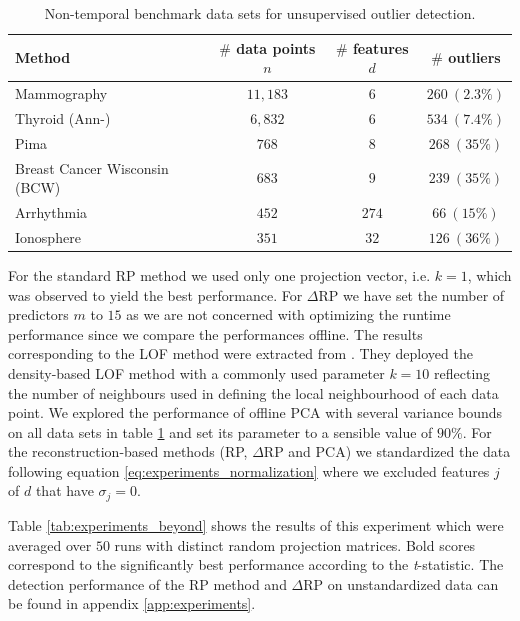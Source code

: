 \begin{table}[h]
	\centering
	\vspace{-0.05cm}
	\caption{Non-temporal benchmark data sets for unsupervised outlier detection.}
	\label{tab:experiments_beyond_data}
	\begin{tabular}{l c c c}
		\toprule	
		\textbf{Method}		& 	\textbf{$\#$ data points $n$}	& \textbf{$\#$ features $d$} & \textbf{$\#$ outliers}	\\
		\midrule
		Mammography	& $11,183$	&   $6$		&	$260 \ (2.3 \%)$	\\
		Thyroid (Ann-)	& $6,832$	&   $6$		&	$534 \ (7.4 \%)$	\\
		Pima		& $768$		&   $8$		& 	$268 \ (35 \%)$	\\
		Breast Cancer Wisconsin (BCW)	& $683$		& 	$9$		&	$239 \ (35 \%)$	\\
		Arrhythmia	& $452$		&	$274$	&	$66 \ (15\%)$		\\
		Ionosphere	& $351$		&	$32$	&	$126 \ (36\%)$	\\
		\bottomrule
	\end{tabular}
	\vspace{-0.05cm}
\end{table}

For the standard RP method we used only one projection vector, i.e. $k=1$, which was observed to yield the best performance. For $\Delta$RP we have set the number of predictors $m$ to $15$ as we are not concerned with optimizing the runtime performance since we compare the performances offline.
The results corresponding to the LOF method were extracted from \cite{liu2008isolation}. They deployed the density-based LOF method with a commonly used parameter $k=10$ reflecting the number of neighbours used in defining the local neighbourhood of each data point. We explored the performance of offline PCA with several variance bounds on all data sets in table \ref{tab:experiments_beyond_data} and set its parameter to a sensible value of $90\%$. For the reconstruction-based methods (RP, $\Delta$RP and PCA) we standardized the data following equation \eqref{eq:experiments_normalization} where we excluded features $j$ of $d$ that have $\sigma_j = 0$.

Table \ref{tab:experiments_beyond} shows the results of this experiment which were averaged over $50$ runs with distinct random projection matrices. Bold scores correspond to the significantly best performance according to the \textit{t}-statistic. The detection performance of the RP method and $\Delta$RP on unstandardized data can be found in appendix \ref{app:experiments}. 

